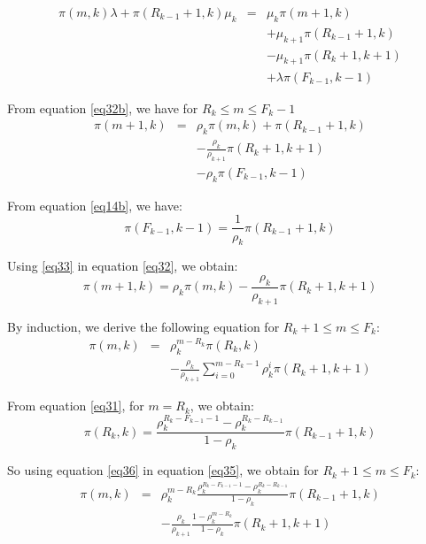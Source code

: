 \documentclass[conference]{IEEEtran}
\begin{document}
\begin{eqnarray}
\pi(m,k)\lambda +   \pi(R_{k-1}+1,k) \mu_k &=& \mu_k \pi(m+1,k) \nonumber\\
&&+  \mu_{k+1} \pi(R_{k-1}+1,k) \nonumber \\
&&- \mu_{k+1} \pi(R_{k}+1, k+1) \nonumber \\
&&+  \lambda \pi(F_{k-1}, k-1)
\label{eq32b}
\end{eqnarray}

From equation \ref{eq32b}, we have for $R_{k} \leq m \leq F_k-1$
\begin{eqnarray}
\pi(m+1,k)  &=& \rho_k \pi(m,k) +  \pi(R_{k-1}+1,k) \nonumber\\
&&- \frac{\rho_k}{\rho_{k+1}} \pi(R_{k}+1, k+1) \nonumber \\
&&- \rho_k \pi(F_{k-1}, k-1)
\label{eq32}
\end{eqnarray}

From equation  \ref{eq14b}, we have:
\begin{equation}
\pi(F_{k-1},k-1)= \frac{1}{\rho_k} \pi(R_{k-1}+1,k)
\label{eq33}
\end{equation}

Using \ref{eq33} in equation \ref{eq32}, we obtain:
\begin{equation}
\pi(m+1,k)  = \rho_k \pi(m,k)    - \frac{\rho_k}{\rho_{k+1}} \pi(R_{k}+1, k+1)
\label{eq34}
\end{equation}


By induction, we derive the following equation for $R_k+1 \leq m \leq F_k$:
\begin{eqnarray}
\pi(m,k)  &=& \rho_k^{m-R_k} \pi(R_k,k)  \nonumber  \\
&&- \frac{\rho_k}{\rho_{k+1}} \sum_{i=0}^{m-R_k-1} \rho_k^i \pi(R_{k}+1, k+1)
\label{eq35}
\end{eqnarray}

From equation \ref{eq31}, for $m=R_k$, we obtain:
 \begin{equation}
\pi(R_k,k)= \frac{ \rho_k^{R_k-F_{k-1}-1}-\rho_k^{R_k-R_{k-1}} } {1-\rho_k} \pi(R_{k-1}+1,k)
\label{eq36}
\end{equation}

So using equation \ref{eq36} in equation \ref{eq35}, we obtain for $R_k+1 \leq m \leq F_k$:
\begin{eqnarray}
\pi(m,k)&=&\rho_k^{m-R_k} \frac{ \rho_k^{R_k-F_{k-1}-1}-\rho_k^{R_k-R_{k-1}} } {1-\rho_k} \pi(R_{k-1}+1,k) \nonumber\\
&&- \frac{\rho_k}{\rho_{k+1}} \frac{1- \rho_k ^{m-R_k}} {1-\rho_k} \pi(R_{k}+1, k+1)
 \label{eq37}
\end{eqnarray}
\end{document}
